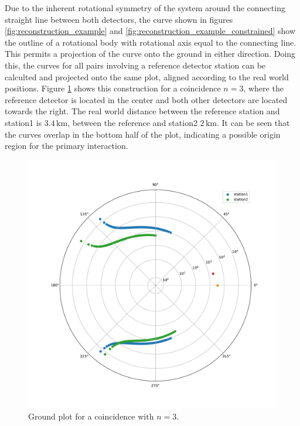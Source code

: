 \documentclass[abstract,toc,los,lof,english,10pt,glossary,acronyms]{jluthesis}
\begin{document}
Due to the inherent rotational symmetry of the system around the connecting straight line between both detectors, the curve shown in figures \ref{fig:reconstruction_example} and \ref{fig:reconstruction_example_constrained} show the outline of a rotational body with rotational axis equal to the connecting line. This permits a projection of the curve onto the ground in either direction. Doing this, the curves for all pairs involving a reference detector station can be calculted and projected onto the same plot, aligned according to the real world positions. Figure \ref{fig:reconstruction_example_ground} shows this construction for a coincidence $n=3$, where the reference detector is located in the center and both other detectors are located towards the right. The real world distance between the reference station and station1 is $3.4\,\text{km}$, between the reference and station2 $2\,\text{km}$.
It can be seen that the curves overlap in the bottom half of the plot, indicating a possible origin region for the primary interaction.
\begin{figure}[ht!]
	\centering
	\includegraphics[width=0.4\linewidth]{data/example_plot_ground}
	\caption{Ground plot for a coincidence with $n=3$.}
	\label{fig:reconstruction_example_ground}
\end{figure}
\clearpage
\end{document}
